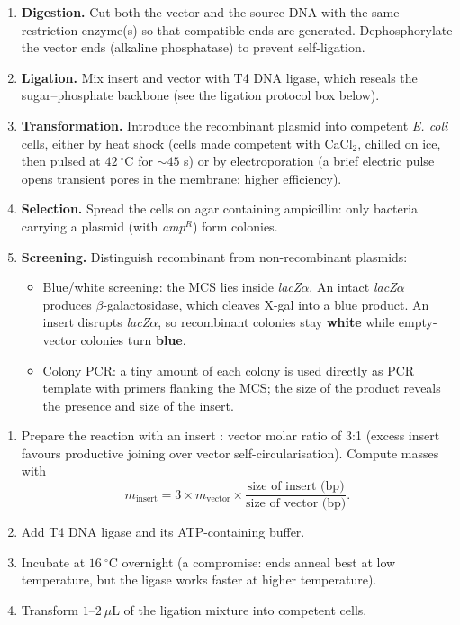 \documentclass[11pt]{article}
\newcommand{\cle}[1]{{\popxbold\color{popdark}#1}}
\begin{document}
\begin{methode}
\begin{enumerate}
\item \textbf{Digestion.} Cut both the vector and the source DNA with the same restriction enzyme(s) so that compatible ends are generated. Dephosphorylate the vector ends (alkaline phosphatase) to prevent self-ligation.
\item \textbf{Ligation.} Mix insert and vector with T4 DNA ligase, which reseals the sugar--phosphate backbone (see the ligation protocol box below).
\item \textbf{Transformation.} Introduce the recombinant plasmid into competent \emph{E. coli} cells, either by \cle{heat shock} (cells made competent with CaCl$_2$, chilled on ice, then pulsed at $42\ ^\circ$C for $\sim 45$ s) or by \cle{electroporation} (a brief electric pulse opens transient pores in the membrane; higher efficiency).
\item \textbf{Selection.} Spread the cells on agar containing ampicillin: only bacteria carrying a plasmid (with \emph{amp}$^R$) form colonies.
\item \textbf{Screening.} Distinguish recombinant from non-recombinant plasmids:
\begin{itemize}
\item \cle{Blue/white screening}: the MCS lies inside \emph{lacZ}$\alpha$. An intact \emph{lacZ}$\alpha$ produces $\beta$-galactosidase, which cleaves X-gal into a blue product. An insert disrupts \emph{lacZ}$\alpha$, so recombinant colonies stay \textbf{white} while empty-vector colonies turn \textbf{blue}.
\item \cle{Colony PCR}: a tiny amount of each colony is used directly as PCR template with primers flanking the MCS; the size of the product reveals the presence and size of the insert.
\end{itemize}
\end{enumerate}
\end{methode}

\begin{methode}
\begin{enumerate}
\item Prepare the reaction with an \cle{insert : vector molar ratio of 3:1} (excess insert favours productive joining over vector self-circularisation). Compute masses with
\[
m_{\text{insert}} = 3 \times m_{\text{vector}} \times \frac{\text{size of insert (bp)}}{\text{size of vector (bp)}} .
\]
\item Add T4 DNA ligase and its ATP-containing buffer.
\item Incubate at $16\ ^\circ$C overnight (a compromise: ends anneal best at low temperature, but the ligase works faster at higher temperature).
\item Transform $1$--$2\ \mu$L of the ligation mixture into competent cells.
\end{enumerate}
\end{methode}
\end{document}
